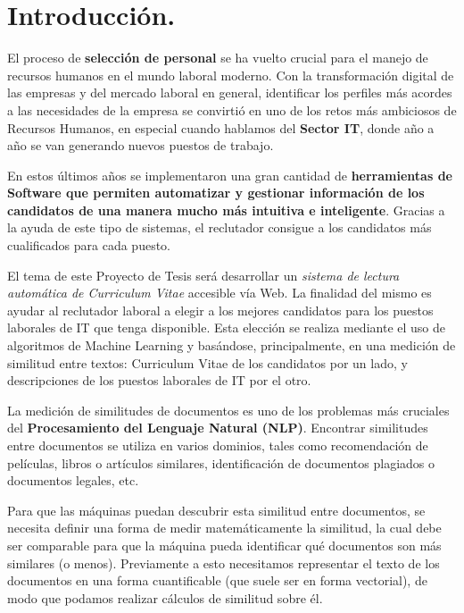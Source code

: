 \documentclass[12pt,a4paper]{article}
\begin{document}
\cleardoublepage    %

\tableofcontents 	%

\cleardoublepage    %

\section{Introducción.}
El proceso de \textbf{selección de personal} se ha vuelto crucial para el manejo de recursos humanos en el mundo laboral moderno. Con la transformación digital de las empresas y del mercado laboral en general, identificar los perfiles más acordes a las necesidades de la empresa se convirtió en uno de los retos más ambiciosos de Recursos Humanos, en especial cuando hablamos del \textbf{Sector IT}, donde año a año se van generando nuevos puestos de trabajo. 

En estos últimos años se implementaron una gran cantidad de \textbf{herramientas de Software que permiten automatizar y gestionar información de los candidatos de una manera mucho más intuitiva e inteligente}. Gracias a la ayuda de este tipo de sistemas, el reclutador consigue a los candidatos más cualificados para cada puesto.

El tema de este Proyecto de Tesis será desarrollar un \textit{sistema de lectura automática de Curriculum Vitae} accesible vía Web. La finalidad del mismo es ayudar al reclutador laboral a elegir a los mejores candidatos para los puestos laborales de IT que tenga disponible. Esta elección se realiza mediante el uso de algoritmos de Machine Learning y basándose, principalmente, en una medición de similitud entre textos: Curriculum Vitae de los candidatos por un lado, y descripciones de los puestos laborales de IT por el otro.

La medición de similitudes de documentos es uno de los problemas más cruciales del \textbf{Procesamiento del Lenguaje Natural (NLP)}. Encontrar similitudes entre documentos se utiliza en varios dominios, tales como recomendación de películas, libros o artículos similares, identificación de documentos plagiados o documentos legales, etc. 

Para que las máquinas puedan descubrir esta similitud entre documentos, se necesita definir una forma de medir matemáticamente la similitud, la cual debe ser comparable para que la máquina pueda identificar qué documentos son más similares (o menos). Previamente a esto necesitamos representar el texto de los documentos en una forma cuantificable (que suele ser en forma vectorial), de modo que podamos realizar cálculos de similitud sobre él.
\end{document}
